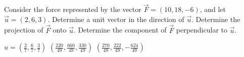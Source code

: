 
\begin{Exercise}[
name={},
title={}, 
difficulty=0,
origin={\cite{SM}}]
Consider the force represented by the vector $\vec{F}=(10,18,-6)$, and let $\vec{u}=(2,6,3)$.
\Question Determine a unit vector in the direction of $\vec{u}$.
\Question Determine the projection of $\vec{F}$ onto $\vec{u}$.
\Question Determine the component of $\vec{F}$ perpendicular to $\vec{u}$.
\end{Exercise}

\begin{Answer}
\Question $\hat{u}=\left(\frac{2}{7},\frac{6}{7},\frac{3}{7}\right)$
\Question $\left(\frac{220}{49},\frac{660}{49},\frac{330}{49}\right)$
\Question $\left(\frac{270}{49},\frac{222}{49},-\frac{624}{49}\right)$
\end{Answer}
